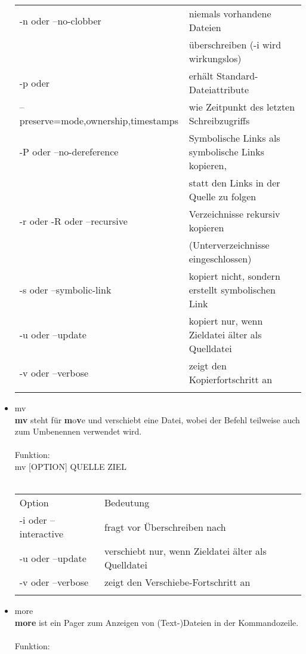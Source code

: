 \begin{itemize}
\begin{tabular}{ll}
				-n oder --no-clobber & niemals vorhandene Dateien\\
				& \"uberschreiben (-i wird wirkungslos)\\
				-p oder & erh\"alt Standard-Dateiattribute\\
				 --preserve=mode,ownership,timestamps & wie Zeitpunkt des letzten Schreibzugriffs\\
				-P oder --no-dereference & Symbolische Links als symbolische Links kopieren,\\
				& statt den Links in der Quelle zu folgen\\
				-r oder -R oder --recursive & Verzeichnisse rekursiv kopieren\\
				& (Unterverzeichnisse eingeschlossen)\\
				-s oder --symbolic-link & kopiert nicht, sondern erstellt symbolischen Link\\
				-u oder --update & kopiert nur, wenn Zieldatei \"alter als Quelldatei\\
				-v oder --verbose & zeigt den Kopierfortschritt an\\ \\
			\end{tabular}
			\item mv\\
			\textbf{mv} steht für \textbf{m}o\textbf{v}e und verschiebt eine Datei, wobei der Befehl teilweise auch zum Umbenennen verwendet wird.\\ \\
			Funktion:\\
			mv [OPTION] QUELLE ZIEL\\ \\
			\begin{tabular}{ll}
				Option & Bedeutung \\
				-i oder --interactive & fragt vor \"Uberschreiben nach\\
				-u oder --update & verschiebt nur, wenn Zieldatei \"alter als Quelldatei\\
				-v oder --verbose & zeigt den Verschiebe-Fortschritt an\\ \\
			\end{tabular}
			\newpage
			\item more\\
			\textbf{more} ist ein Pager zum Anzeigen von (Text-)Dateien in der Kommandozeile.\\ \\
			Funktion:\\

\end{itemize}
